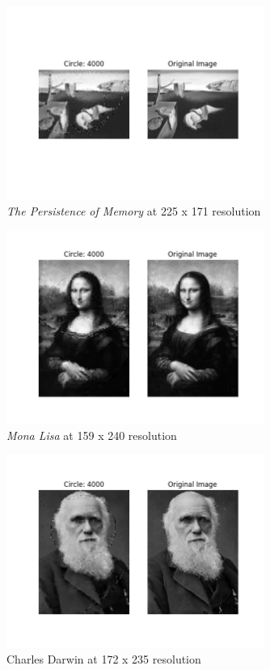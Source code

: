 \documentclass[12pt]{article}
\begin{document}
\begin{figure}[H]
\centering
\noindent\includegraphics[width=0.75\textwidth]{../results/dali/dali_4000}
\caption{\textit{The Persistence of Memory} at 225 x 171 resolution}
\end{figure}

\begin{figure}[H]
\centering
\noindent\includegraphics[width=0.75\textwidth]{../results/mona_lisa/mona_lisa_4000}
\caption{\textit{Mona Lisa} at 159 x 240 resolution}
\end{figure}

\begin{figure}[H]
\centering
\noindent\includegraphics[width=0.75\textwidth]{../results/darwin/darwin_4000}
\caption{Charles Darwin at 172 x 235 resolution}
\end{figure}
\end{document}
